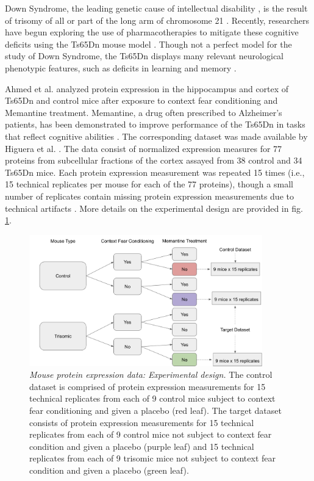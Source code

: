 \documentclass{article}
\begin{document}
Down Syndrome, the leading genetic cause of intellectual disability , is the result of trisomy of all or part of the long arm of chromosome 21 . Recently, researchers have begun exploring the use of pharmacotherapies to mitigate these cognitive deficits using the Ts65Dn mouse model . Though not a perfect model for the study of Down Syndrome, the Ts65Dn displays many relevant neurological phenotypic features, such as deficits in learning and memory .

Ahmed et al.  analyzed protein expression in the hippocampus and cortex of Ts65Dn and control mice after exposure to context fear conditioning and Memantine treatment. Memantine, a drug often prescribed to Alzheimer's patients, has been demonstrated to improve performance of the Ts65Dn in tasks that reflect cognitive abilities . The corresponding dataset was made available by Higuera et al. . The data consist of normalized expression measures for 77 proteins from subcellular fractions of the cortex assayed from 38 control and 34 Ts65Dn mice. Each protein expression measurement was repeated 15 times (i.e., 15 technical replicates per mouse for each of the 77 proteins), though a small number of replicates contain missing protein expression measurements due to technical artifacts . More details on the experimental design are provided in fig. \ref{fig:exp_design}.

\begin{figure}[!htbp]
    \centering
    \includegraphics[width=0.9\textwidth]{figures/mice_exp_design}
    \caption{
    {\em Mouse protein expression data: Experimental design.} 
    The control dataset is comprised of protein expression measurements for 15 technical replicates from each of 9 control mice subject to context fear conditioning and given a placebo (red leaf). The target dataset consists of protein expression measurements for 15 technical replicates from each of 9 control mice not subject to context fear condition and given a placebo (purple leaf) and 15 technical replicates from each of 9 trisomic mice not subject to context fear condition and given a placebo (green leaf).}
    \label{fig:exp_design}
\end{figure}
\end{document}
